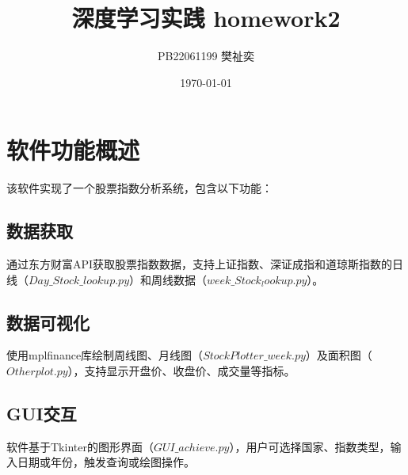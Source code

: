 \documentclass{ctexart}
\title{ 深度学习实践 homework2}
\author{PB22061199 樊祉奕}
\date{\today}
\begin{document}
\maketitle
\section{软件功能概述}
该软件实现了一个股票指数分析系统，包含以下功能：

\subsection{数据获取}
通过东方财富API获取股票指数数据，支持上证指数、深证成指和道琼斯指数的日线（$Day\_Stock\_lookup.py$）和周线数据（$week\_Stock_lookup.py$）。

\subsection{数据可视化}
使用mplfinance库绘制周线图、月线图（$StockPlotter\_week.py$）及面积图（$Otherplot.py$），支持显示开盘价、收盘价、成交量等指标。

\subsection{GUI交互}
软件基于Tkinter的图形界面（$GUI\_achieve.py$），用户可选择国家、指数类型，输入日期或年份，触发查询或绘图操作。
\end{document}
